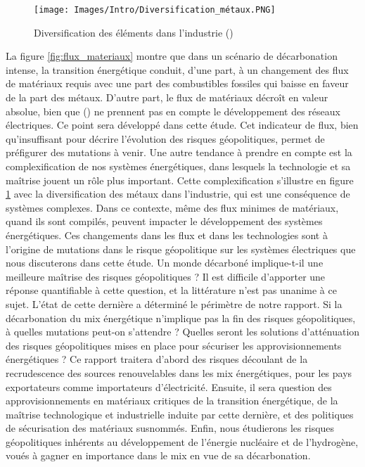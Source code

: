 \begin{figure}[!b]
    \centering
    \texttt{[image: Images/Intro/Diversification\_métaux.PNG]}
    \caption{Diversification des éléments dans l'industrie (\cite{hartard_strategic_2015})}
    \label{fig:divers_metal}
\end{figure}
La figure \ref{fig:flux_materiaux} montre que dans un scénario de décarbonation intense, la transition énergétique conduit, d'une part, à un changement des flux de matériaux requis avec une part des combustibles fossiles qui baisse en faveur de la part des métaux. D'autre part, le flux de matériaux décroît en valeur absolue, bien que (\cite{watari_sustainable_2021}) ne prennent pas en compte le développement des réseaux électriques. Ce point sera développé dans cette étude. Cet indicateur de flux, bien qu'insuffisant pour décrire l'évolution des risques géopolitiques, permet de préfigurer des mutations à venir. Une autre tendance à prendre en compte est la complexification de nos systèmes énergétiques, dans lesquels la technologie et sa maîtrise jouent un rôle plus important. Cette complexification s'illustre en figure \ref{fig:divers_metal} avec la  diversification des métaux dans l'industrie, qui est une conséquence de systèmes complexes. Dans ce contexte, même des flux minimes de matériaux, quand ils sont compilés, peuvent impacter le développement des systèmes énergétiques.
Ces changements dans les flux et dans les technologies sont à l'origine de mutations dans le risque géopolitique sur les systèmes électriques que nous discuterons dans cette étude.
\smallbreak
Un monde décarboné implique-t-il une meilleure maîtrise des risques géopolitiques ? Il est difficile d'apporter une réponse quantifiable à cette question, et la littérature n'est pas unanime à ce sujet. L'état de cette dernière a déterminé le périmètre de notre rapport.
\smallbreak
Si la décarbonation du mix énergétique n'implique pas la fin des risques géopolitiques, à quelles mutations peut-on s'attendre ? Quelles seront les solutions d'atténuation des risques géopolitiques mises en place pour sécuriser les approvisionnements énergétiques ?
\smallbreak
Ce rapport traitera d'abord des risques découlant de la recrudescence des sources renouvelables dans les mix énergétiques, pour les pays exportateurs comme importateurs d'électricité. Ensuite, il sera question des approvisionnements en matériaux critiques de la transition énergétique, de la maîtrise technologique et industrielle induite par cette dernière, et des politiques de sécurisation des matériaux susnommés. Enfin, nous étudierons les risques géopolitiques inhérents au développement de l'énergie nucléaire et de l'hydrogène, voués à gagner en importance dans le mix en vue de sa décarbonation.
